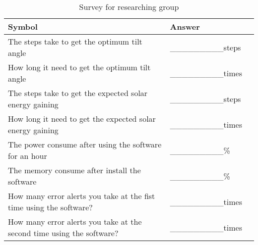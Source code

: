 \documentclass[12pt, titlepage]{article}
\begin{document}
\begin{table}[h!]
  \noindent \begin{tabular}{l l l} 
    \toprule		
    \textbf{Symbol} & \textbf{Answer} \\
    \midrule 
    The steps take to get the optimum tilt angle & \_\_\_\_\_\_\_\_\_steps  \\
    How long it need to get the optimum tilt angle & \_\_\_\_\_\_\_\_\_times  \\
    The steps take to get the expected solar energy gaining & \_\_\_\_\_\_\_\_\_steps  \\
    How long it need to get the expected solar energy gaining & \_\_\_\_\_\_\_\_\_times  \\
    The power consume after using the software for an hour & \_\_\_\_\_\_\_\_\_\%  \\
    The memory consume after install the software  & \_\_\_\_\_\_\_\_\_\%  \\
    How many error alerts you take at the fist time using the software? & \_\_\_\_\_\_\_\_\_times  \\
    How many error alerts you take at the second time using the software? & \_\_\_\_\_\_\_\_\_times  \\
    \bottomrule
  \end{tabular}
  \caption{Survey for researching  group}
\end{table}
\end{document}

